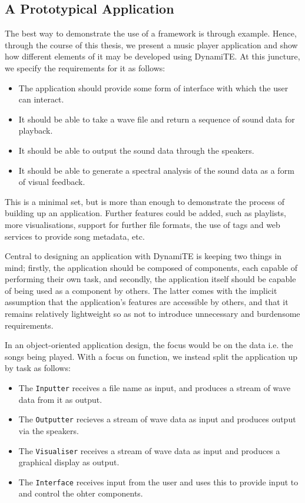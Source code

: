 \subsection{A Prototypical Application}
\label{app:req}

The best way to demonstrate the use of a framework is through example.
Hence, through the course of this thesis, we present a music player
application and show how different elements of it may be developed
using DynamiTE.  At this juncture, we specify the requirements for it
as follows:

\begin{itemize}
\item The application should provide some form of interface with which
  the user can interact.
\item It should be able to take a wave file and return a sequence of
  sound data for playback.
\item It should be able to output the sound data through the speakers.
\item It should be able to generate a spectral analysis of the sound
  data as a form of visual feedback.
\end{itemize}

This is a minimal set, but is more than enough to demonstrate the
process of building up an application.  Further features could be
added, such as playlists, more visualisations, support for further
file formats, the use of tags and web services to provide song
metadata, etc.

Central to designing an application with DynamiTE is keeping two
things in mind; firstly, the application should be composed of
components, each capable of performing their own task, and secondly,
the application itself should be capable of being used as a component
by others.  The latter comes with the implicit assumption that the
application's features are accessible by others, and that it remains
relatively lightweight so as not to introduce unnecessary and
burdensome requirements.

In an object-oriented application design, the focus would be on the
data i.e. the songs being played.  With a focus on function, we
instead split the application up by task as follows:

\begin{itemize}
\item The \texttt{Inputter} receives a file name as input, and
  produces a stream of wave data from it as output.
\item The \texttt{Outputter} recieves a stream of wave data as input
  and produces output via the speakers.
\item The \texttt{Visualiser} receives a stream of wave data as input
  and produces a graphical display as output.
\item The \texttt{Interface} receives input from the user and uses
  this to provide input to and control the ohter components.
\end{itemize}

